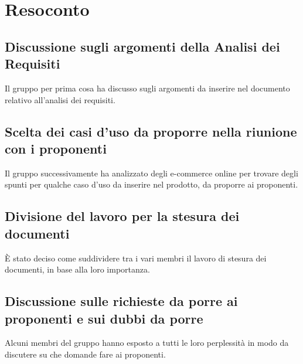 \documentclass[a4paper]{article}
\begin{document}
    \section{Resoconto}
    
        \subsection{Discussione sugli argomenti della Analisi dei Requisiti}
        Il gruppo per prima cosa ha discusso sugli argomenti da inserire nel documento relativo all'analisi dei requisiti.
        \subsection{Scelta dei casi d'uso da proporre nella riunione con i proponenti}
        Il gruppo successivamente ha analizzato degli e-commerce online per trovare degli spunti per qualche caso d'uso da inserire nel prodotto, da proporre ai proponenti.
        \subsection{Divisione del lavoro per la stesura dei documenti}
        È stato deciso come suddividere tra i vari membri il lavoro di stesura dei documenti, in base alla loro importanza.
        \subsection{Discussione sulle richieste da porre ai proponenti e sui dubbi da porre}
        Alcuni membri del gruppo hanno esposto a tutti le loro perplessità in modo da discutere su che domande fare ai proponenti.
        
\end{document}
